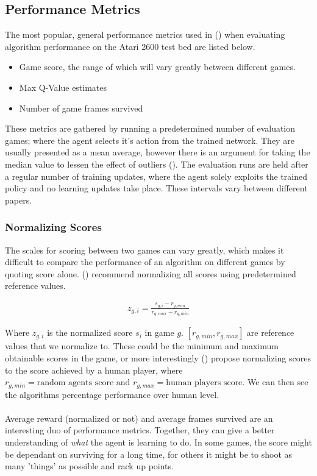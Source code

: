\subsection{Performance Metrics} \label{subsec:metrics}
The most popular, general performance metrics used in (\citet{doubleq,dueling,deepmind1,human,a3c}) when evaluating algorithm performance on the Atari 2600 test bed are listed below.

\begin{itemize}
    \item Game score, the range of which will vary greatly between different games.
    \item Max Q-Value estimates
    \item Number of game frames survived
\end{itemize}

These metrics are gathered by running a predetermined number of evaluation games; where the agent selects it's action from the trained network. They are usually presented as a mean average, however there is an argument for taking the median value to lessen the effect of outliers (\citet{ale-eval-plat}). The evaluation runs are held after a regular number of training updates, where the agent solely exploits the trained policy and no learning updates take place. These intervals vary between different papers.

\subsubsection{Normalizing Scores}
The scales for scoring between two games can vary greatly, which makes it difficult to compare the performance of an algorithm on different games by quoting score alone. (\citet{ale-eval-plat}) recommend normalizing all scores using predetermined reference values.

\begin{align}
    z_{g, i} = \frac{s_{g, i} - r_{g, min}}{r_{g, max} - r_{g, min}}
\end{align}

Where $z_{g, i}$ is the normalized score $s_i$ in game $g$. $[r_{g, min}, r_{g, max}]$ are reference values that we normalize to. These could be the minimum and maximum obtainable scores in the game, or more interestingly (\citet{human}) propose normalizing scores to the score achieved by a human player, where $r_{g, min} = \text{random agents score } \text{and } r_{g, max} = \text{human players score}$. We can then see the algorithms percentage performance over human level. \paragraph{}

Average reward (normalized or not) and average frames survived are an interesting duo of performance metrics. Together, they can give a better understanding of \textit{what} the agent is learning to do. In some games, the score might be dependant on surviving for a long time, for others it might be to shoot as many 'things' as possible and rack up points.
